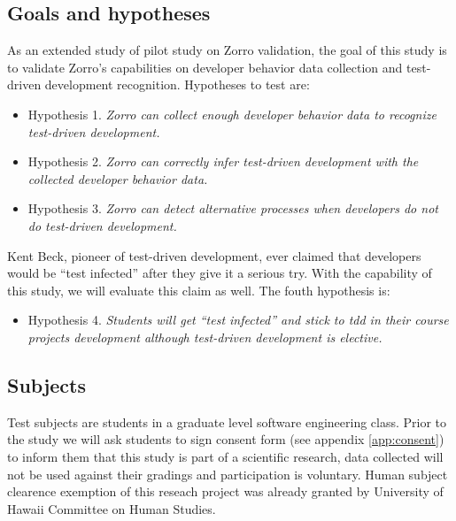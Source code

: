 \subsection{Goals and hypotheses}
As an extended study of pilot study on Zorro validation, the goal of this
study is to validate Zorro's capabilities on developer behavior data
collection and test-driven development recognition. Hypotheses to test are:
\begin{itemize}
\item{Hypothesis 1. }\textit{Zorro can collect enough developer behavior
    data to recognize test-driven development.}
\item{Hypothesis 2. }\textit{Zorro can correctly infer test-driven
    development with the collected developer behavior data.}
\item{Hypothesis 3. }\textit{Zorro can detect alternative processes when
    developers do not do test-driven development.}
\end{itemize}

Kent Beck, pioneer of test-driven development, ever claimed that developers
would be ``test infected'' after they give it a serious try. With the
capability of this study, we will evaluate this claim as well. The fouth
hypothesis is:
\begin{itemize}
\item {Hypothesis 4. } \textit{Students will get ``test infected'' and
    stick to tdd in their course projects development although test-driven
    development is elective.}
\end{itemize}

\subsection{Subjects}
Test subjects are students in a graduate level software engineering class.
Prior to the study we will ask students to sign consent form (see appendix
\ref{app:consent}) to inform them that this study is part of a scientific
research, data collected will not be used against their gradings and
participation is voluntary.  Human subject clearence exemption of this
reseach project was already granted by University of Hawaii Committee on
Human Studies.


